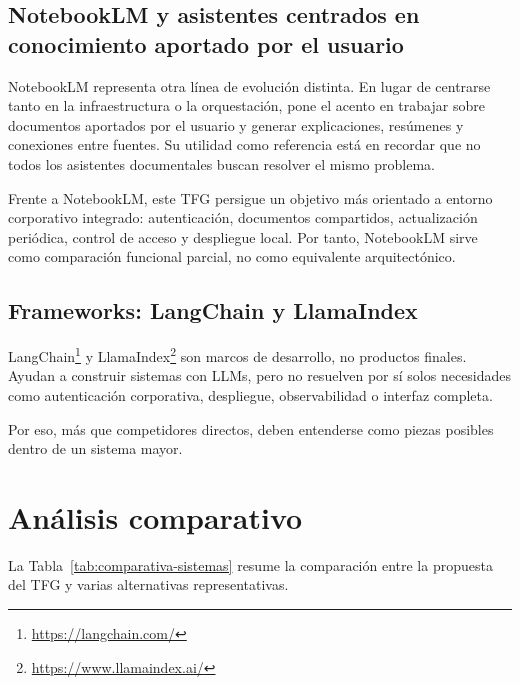 \subsection{NotebookLM y asistentes centrados en conocimiento aportado por el usuario}

NotebookLM representa otra línea de evolución distinta. En lugar de centrarse tanto en la infraestructura o la orquestación, pone el acento en trabajar sobre documentos aportados por el usuario y generar explicaciones, resúmenes y conexiones entre fuentes. Su utilidad como referencia está en recordar que no todos los asistentes documentales buscan resolver el mismo problema.

Frente a NotebookLM, este TFG persigue un objetivo más orientado a entorno corporativo integrado: autenticación, documentos compartidos, actualización periódica, control de acceso y despliegue local. Por tanto, NotebookLM sirve como comparación funcional parcial, no como equivalente arquitectónico.

\subsection{Frameworks: LangChain y LlamaIndex}

LangChain\footnote{\url{https://langchain.com/}} \cite{langchainRetrievalDocs} y LlamaIndex\footnote{\url{https://www.llamaindex.ai/}} \cite{llamaindexRagDocs} son marcos de desarrollo, no productos finales. Ayudan a construir sistemas con LLMs, pero no resuelven por sí solos necesidades como autenticación corporativa, despliegue, observabilidad o interfaz completa.

Por eso, más que competidores directos, deben entenderse como piezas posibles dentro de un sistema mayor.

\section{Análisis comparativo}

La Tabla~\ref{tab:comparativa-sistemas} resume la comparación entre la propuesta del TFG y varias alternativas representativas.

